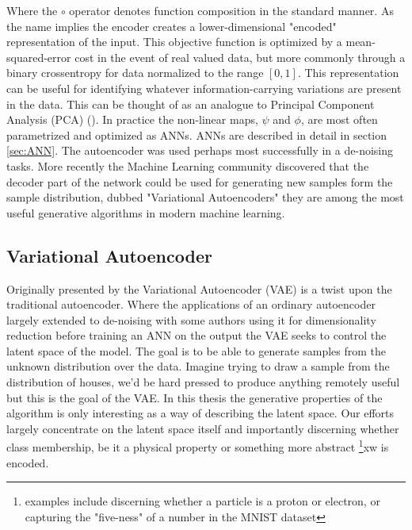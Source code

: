 \noindent  Where the $\circ$ operator denotes function composition in the standard manner. As the name implies the encoder creates a lower-dimensional "encoded" representation of the input. This objective function is optimized by a mean-squared-error cost in the event of real valued data, but more commonly through a binary crossentropy for data normalized to the range $[0, 1]$.
This representation can be useful for identifying whatever information-carrying variations are present in the data. This can be thought of as an analogue to Principal Component Analysis (PCA) (\cite{Marsland2009}). In practice the non-linear maps, $\psi$ and $\phi$, are most often parametrized and optimized as ANNs. ANNs are described in detail in section \ref{sec:ANN}. The autoencoder was used perhaps most successfully in a de-noising tasks. 
More recently the Machine Learning community discovered that the decoder part of the network could be used for generating
new samples form the sample distribution, dubbed "Variational Autoencoders" they are among the most useful generative algorithms in modern machine learning.

\subsection{Variational Autoencoder}

Originally presented by \citet{Kingma2013} the Variational Autoencoder (VAE) is a twist upon the traditional autoencoder. Where the applications of an ordinary autoencoder largely extended to de-noising with some authors using it for dimensionality reduction before training an ANN on the output the VAE seeks to control the latent space of the model. The goal is to be able to generate samples from the unknown distribution over the data. Imagine trying to draw a sample from the distribution of houses, we'd be hard pressed to produce anything remotely useful but this is the goal of the VAE. In this thesis the generative properties of the algorithm is only interesting as a way of describing the latent space. Our efforts largely concentrate on the latent space itself and importantly discerning whether class membership, be it a physical property or something more abstract \footnote{examples include discerning whether a particle is  a proton or electron, or capturing the "five-ness" of a number in the MNIST dataset}xw is encoded.

